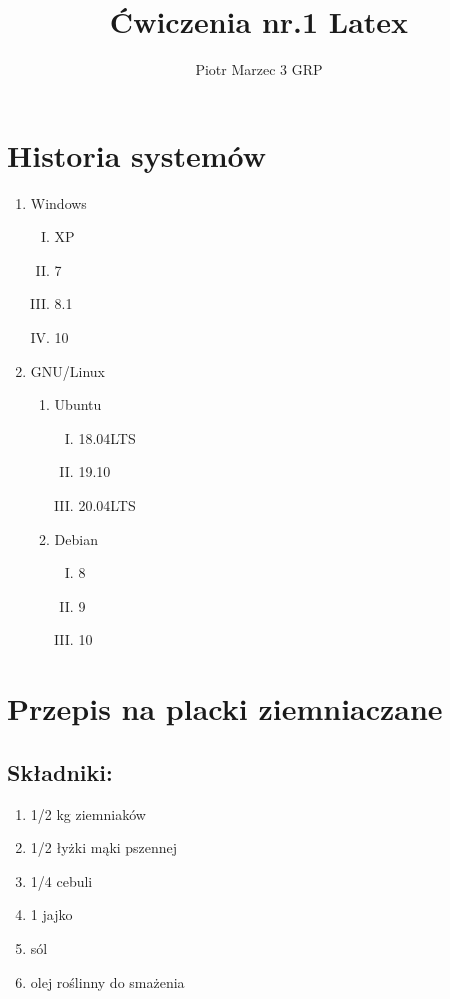 \documentclass[a4paper]{article}
\author{Piotr Marzec 3 GRP}
\title{Ćwiczenia nr.1 Latex}
\begin{document}
\maketitle
\newpage
\section{Historia systemów}
\begin{enumerate}
	\item Windows
		\begin{enumerate}[I.)]
			\item XP
			\item 7
			\item 8.1
			\item 10
		\end{enumerate}
	\item GNU/Linux
		\begin{enumerate}
			\item Ubuntu
			\begin{enumerate}[I.)]
				\item 18.04LTS
				\item 19.10
				\item 20.04LTS
			\end{enumerate}
			\item Debian
				\begin{enumerate}[I.)]
					\item 8
					\item 9
					\item 10
				\end{enumerate}
		\end{enumerate}
\end{enumerate}
\newpage
\section{Przepis na placki ziemniaczane}
\subsection{Składniki:}
\begin{enumerate}
	\item 1/2 kg ziemniaków
	\item 1/2 łyżki mąki pszennej
	\item 1/4 cebuli
	\item 1 jajko
	\item sól
	\item olej roślinny do smażenia
\end{enumerate}
\end{document}
